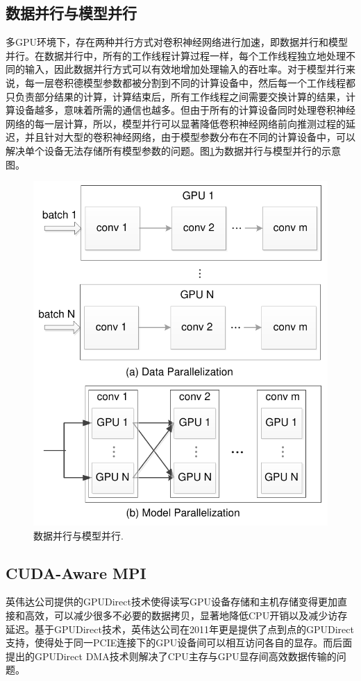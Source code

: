 \subsection{数据并行与模型并行}
多GPU环境下，存在两种并行方式对卷积神经网络进行加速，即数据并行和模型并行。在数据并行中，所有的工作线程计算过程一样，每个工作线程独立地处理不同的输入，因此数据并行方式可以有效地增加处理输入的吞吐率。对于模型并行来说，每一层卷积德模型参数都被分割到不同的计算设备中，然后每一个工作线程都只负责部分结果的计算，计算结束后，所有工作线程之间需要交换计算的结果，计算设备越多，意味着所需的通信也越多。但由于所有的计算设备同时处理卷积神经网络的每一层计算，所以，模型并行可以显著降低卷积神经网络前向推测过程的延迟，并且针对大型的卷积神经网络，由于模型参数分布在不同的计算设备中，可以解决单个设备无法存储所有模型参数的问题。图\ref{dataAndModelParallel}为数据并行与模型并行的示意图。


\begin{figure}[tbh]%
\centering
\includegraphics[width=12cm]{figs/dataAndModelParall.pdf}
\caption{数据并行与模型并行.}
\label{dataAndModelParallel}
\end{figure}

\subsection{CUDA-Aware MPI}
英伟达公司提供的GPUDirect技术使得读写GPU设备存储和主机存储变得更加直接和高效，可以减少很多不必要的数据拷贝，显著地降低CPU开销以及减少访存延迟。基于GPUDirect技术，英伟达公司在2011年更是提供了点到点的GPUDirect支持，使得处于同一PCIE连接下的GPU设备间可以相互访问各自的显存。而后面提出的GPUDirect DMA技术则解决了CPU主存与GPU显存间高效数据传输的问题。


